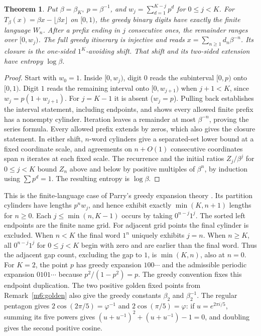 \documentclass[11pt,reqno]{amsart}
\newtheorem{theorem}{Theorem}[section]
\theoremstyle{definition}
\theoremstyle{remark}
\numberwithin{equation}{section}
\begin{document}
\begin{theorem}\label{m9:beta}
Put \(\beta=\beta_K,\ p=\beta^{-1}\), and
\(w_j=\sum_{d=1}^{K-j}p^d\) for \(0\le j<K\).
For \(T_\beta(x)=\beta x-\lfloor\beta x\rfloor\) on \([0,1)\),
the greedy binary digits have exactly the finite language \(W_n\).
After a prefix ending in \(j\) consecutive ones, the remainder
ranges over \([0,w_j)\). The full greedy itinerary is injective
and reads \(x=\sum_{n\ge1} d_n\beta^{-n}\).
Its closure is the one-sided \(1^K\)-avoiding shift. That shift
and its two-sided extension have entropy \(\log\beta\).
\end{theorem}
\begin{proof}
Start with \(w_0=1\). Inside \([0,w_j)\), digit \(0\) reads the
subinterval \([0,p)\) onto \([0,1)\). Digit \(1\) reads the remaining
interval onto \([0,w_{j+1})\) when \(j+1<K\), since
\(w_j=p(1+w_{j+1})\). For \(j=K-1\) it is absent (\(w_j=p\)).
Pulling back establishes the interval statement, including endpoints,
and shows every allowed finite prefix has a nonempty cylinder.
Iteration leaves a remainder at most \(\beta^{-n}\), proving the
series formula. Every allowed prefix extends by zeros, which also
gives the closure statement. In either shift, \(n\)-word cylinders
give a separated-set lower bound at a fixed coordinate scale, and
agreements on \(n+O(1)\) consecutive coordinates span \(n\) iterates
at each fixed scale. The recurrence and the initial ratios
\(Z_j/\beta^j\) for \(0\le j<K\) bound \(Z_n\) above and below by
positive multiples of \(\beta^n\), by induction using
\(\sum p^d=1\). The resulting entropy is \(\log\beta\).
\end{proof}

This is the finite-language case of Parry's greedy expansion
theory \cite{m9:ParryBeta}. Its partition cylinders have lengths
\(p^n w_j\), and hence exhibit exactly \(\min(K,n+1)\) lengths
for \(n\ge0\). Each \(j\le\min(n,K-1)\) occurs by taking
\(0^{n-j}1^j\). The sorted left endpoints are the finite
name grid. For adjacent grid points the final cylinder is
excluded. When \(n<K\) the final word \(1^n\) uniquely
exhibits \(j=n\). When \(n\ge K\), all \(0^{n-j}1^j\) for
\(0\le j<K\) begin with zero and are earlier than the final
word. Thus the adjacent gap count, excluding the gap to \(1\),
is \(\min(K,n)\), also at \(n=0\).
For \(K=2\), the point \(p\) has greedy expansion \(100\cdots\)
and the admissible periodic expansion \(0101\cdots\) because
\(p^2/(1-p^2)=p\). The greedy convention fixes this endpoint
duplication. The two positive golden fixed points from Remark~\ref{m6:golden}
also give the greedy constants \(\beta_2\) and \(\beta_2^{-1}\). The regular pentagon gives
\(2\cos(2\pi/5)=\varphi^{-1}\) and \(2\cos(\pi/5)=\varphi\):
if \(u=e^{2\pi i/5}\), summing its five powers gives
\((u+u^{-1})^2+(u+u^{-1})-1=0\), and doubling gives the second
positive cosine.
\end{document}
